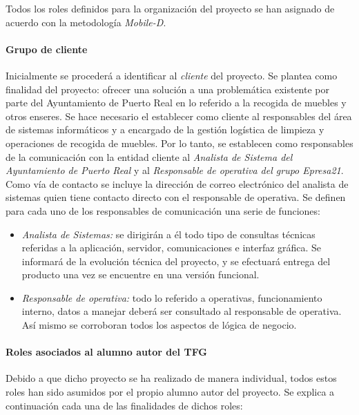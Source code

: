 Todos los roles definidos para la organización del proyecto se han asignado de acuerdo con la metodología \textit{Mobile-D}\cite{AgileMobileD}.
\paragraph{Grupo de cliente}Inicialmente se procederá a identificar al \textit{cliente} del proyecto. Se plantea como finalidad del proyecto: ofrecer una solución a una problemática existente por parte del Ayuntamiento de Puerto Real en lo referido a la recogida de muebles y otros enseres. Se hace necesario el establecer como cliente al responsables del área de sistemas informáticos y a encargado de la gestión logística de limpieza y operaciones de recogida de muebles. Por lo tanto, se establecen como responsables de la comunicación con la entidad cliente al \textit{Analista de Sistema del Ayuntamiento de Puerto Real} y al \textit{Responsable de operativa del grupo Epresa21}. Como vía de contacto se incluye la dirección de correo electrónico del analista de sistemas quien tiene contacto directo con el responsable de operativa. Se definen para cada uno de los responsables de comunicación una serie de funciones:

\begin{itemize}
    \item \textit{Analista de Sistemas: }se dirigirán a él todo tipo de consultas técnicas referidas a la aplicación, servidor, comunicaciones e interfaz gráfica. Se informará de la evolución técnica del proyecto, y se efectuará entrega del producto una vez se encuentre en una versión funcional.
    \item \textit{Responsable de operativa: }todo lo referido a operativas, funcionamiento interno, datos a manejar deberá ser consultado al responsable de operativa. Así mismo se corroboran todos los aspectos de lógica de negocio.
\end{itemize}


\paragraph{Roles asociados al alumno autor del TFG}Debido a que dicho proyecto se ha realizado de manera individual, todos estos roles han sido asumidos por el propio alumno autor del proyecto. Se explica a continuación cada una de las finalidades de dichos roles:

